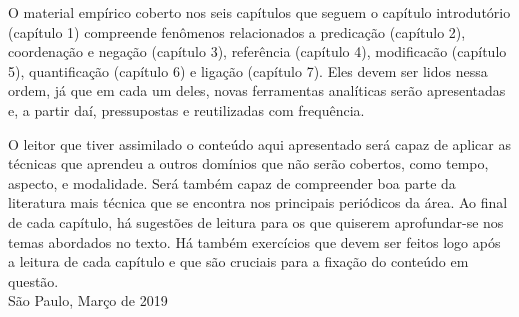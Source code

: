 \begin{refsection}
O material empírico coberto nos seis capítulos que seguem o capítulo introdutório (capítulo 1) compreende fenômenos relacionados a predicação (capítulo 2), coordenação e negação (capítulo 3), referência (capítulo 4), modificacão (capítulo 5), quantificação (capítulo 6) e ligação (capítulo 7). Eles devem ser lidos nessa ordem, já que em cada um deles, novas ferramentas analíticas serão apresentadas e, a partir daí, pressupostas e reutilizadas com frequência.   


O leitor que tiver assimilado o conteúdo aqui apresentado será capaz de aplicar as técnicas que aprendeu a outros domínios que não serão cobertos, como tempo, aspecto, e modalidade. Será também capaz de compreender boa parte da literatura mais técnica que se encontra nos principais periódicos da área. Ao final de cada capítulo, há sugestões de leitura para os que quiserem aprofundar-se nos temas abordados no texto. Há também exercícios que devem ser feitos logo após a leitura de cada capítulo e que são cruciais para a fixação do conteúdo em questão.\\




São Paulo, Março de 2019

\end{refsection}

